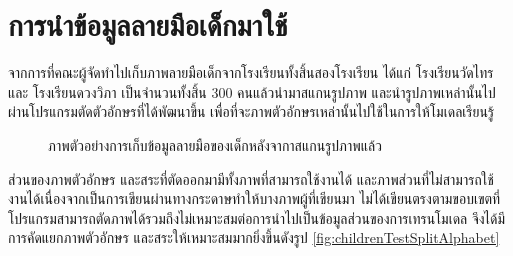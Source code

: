 \documentclass[12pt,oneside,openright,a4paper]{cpe-thai-project}
\begin{document}
\section{การนำข้อมูลลายมือเด็กมาใช้}
จากการที่คณะผู้จัดทำไปเก็บภาพลายมือเด็กจากโรงเรียนทั้งสิ้นสองโรงเรียน ได้แก่ โรงเรียนวัดไทร และ โรงเรียนดวงวิภา เป็นจำนวนทั้งสิ้น 300 คนแล้วนำมาสแกนรูปภาพ และนำรูปภาพเหล่านั้นไปผ่านโปรแกรมตัดตัวอักษรที่ได้พัฒนาขึ้น
เพื่อที่จะภาพตัวอักษรเหล่านั้นไปใช้ในการให้โมเดลเรียนรู้   
\begin{figure}[!ht]\centering
  \setlength{\fboxrule}{0.2mm} %
  \setlength{\fboxsep}{1cm}
  \caption{ภาพตัวอย่างการเก็บข้อมูลลายมือของเด็กหลังจากาสแกนรูปภาพแล้ว}\label{fig:childrenTest}
\end{figure}
\newpage
ส่วนของภาพตัวอักษร และสระที่ตัดออกมามีทั้งภาพที่สามารถใช้งานได้ และภาพส่วนที่ไม่สามารถใช้งานได้เนื่องจากเป็นการเขียนผ่านทางกระดาษทำให้บางภาพผู้ที่เขียนมา
ไม่ได้เขียนตรงตามขอบเขตที่โปรแกรมสามารถตัดภาพได้รวมถึงไม่เหมาะสมต่อการนำไปเป็นข้อมูลส่วนของการเทรนโมเดล จึงได้มีการคัดแยกภาพตัวอักษร และสระให้เหมาะสมมากยิ่งขึ้นดังรูป \ref{fig:childrenTestSplitAlphabet} 
\end{document}
